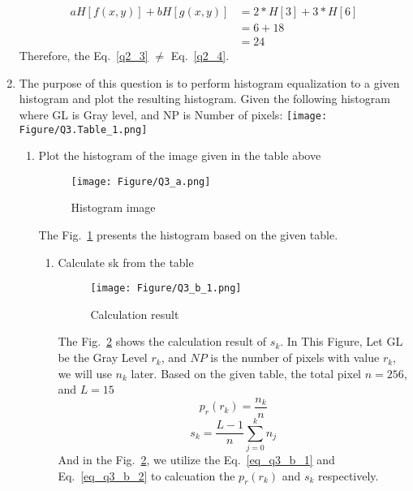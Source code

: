 \documentclass[12pt]{article}
\begin{document}
\begin{enumerate}[leftmargin=\labelsep]
        \begin{equation}
        \begin{aligned}
        aH[f(x,y)] + bH[g(x,y)]
        &= 2*H[3] + 3*H[6]\\
        &= 6 + 18\\
        &= 24
        \label{q2_4}
        \end{aligned}
        \end{equation}
Therefore, the Eq.~\ref{q2_3} $\neq$ Eq.~\ref{q2_4}.


\item  The purpose of this question is to perform histogram equalization to a given histogram and plot the resulting histogram. Given the following histogram where GL is Gray level, and NP is Number of pixels:
\texttt{[image: Figure/Q3.Table\_1.png]}

        \begin{enumerate}
                \item Plot the histogram of the image given in the table above
                        \begin{figure}[H]
                        \centering
                        \texttt{[image: Figure/Q3\_a.png]}
                        \caption{Histogram image}
                        \label{q3_a}
                        \end{figure}
                The Fig.~\ref{q3_a} presents the histogram based on the given table.
                \begin{enumerate}
                        \item Calculate sk from the table
                        \begin{figure}[H]
                        \centering
                        \texttt{[image: Figure/Q3\_b\_1.png]}
                        \caption{Calculation result}
                        \label{q3_b_1}
                        \end{figure}
                        The Fig.~\ref{q3_b_1} shows the calculation result of $s_k$. 
                        In This Figure, Let GL be the Gray Level $r_k$, and $NP$ is the number of pixels with value $r_k$, we will use $n_k$ later. Based on the given table, the total pixel $n = 256$, and $L = 15$
                        \begin{equation}
                                p_r(r_k) = \frac{n_k}{n} 
                        \label{eq_q3_b_1}
                        \end{equation}
                        \begin{equation}
                                s_k = \frac{L-1}{n}\sum_{j = 0}^k n_j
                        \label{eq_q3_b_2}
                        \end{equation}
                        And in the Fig.~\ref{q3_b_1}, we utilize the Eq.~\ref{eq_q3_b_1} and Eq.~\ref{eq_q3_b_2} to calcuation the $p_r(r_k)$ and $s_k$ respectively.
                \end{enumerate}
                \vspace*{2em}


\end{enumerate}
\end{enumerate}
\end{document}
